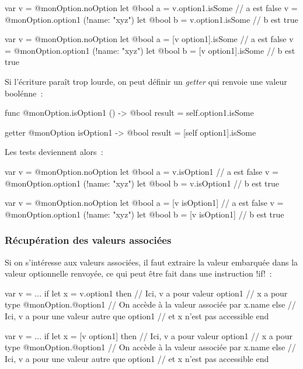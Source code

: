 \begin{galgas4}
var v = @monOption.noOption
let @bool a = v.option1.isSome // a est false
v = @monOption.option1 (!name: "xyz")
let @bool b = v.option1.isSome // b est true
\end{galgas4}
\begin{galgas3}
var v = @monOption.noOption
let @bool a = [v option1].isSome // a est false
v = @monOption.option1 (!name: "xyz")
let @bool b = [v option1].isSome // b est true
\end{galgas3}

Si l'écriture paraît trop lourde, on peut définir un \emph{getter} qui renvoie une valeur boolénne~:
\begin{galgas4}
func @monOption.isOption1 () -> @bool {
  result = self.option1.isSome
}
\end{galgas4}
\begin{galgas3}
getter @monOption isOption1 -> @bool {
  result = [self option1].isSome
}
\end{galgas3}

Les tests deviennent alors~:
\begin{galgas4}
var v = @monOption.noOption
let @bool a = v.isOption1 // a est false
v = @monOption.option1 (!name: "xyz")
let @bool b = v.isOption1 // b est true
\end{galgas4}
\begin{galgas3}
var v = @monOption.noOption
let @bool a = [v isOption1] // a est false
v = @monOption.option1 (!name: "xyz")
let @bool b = [v isOption1] // b est true
\end{galgas3}




\subsubsection{Récupération des valeurs associées}

Si on s'intéresse aux valeurs associées, il faut extraire la valeur embarquée dans la valeur optionnelle renvoyée, ce qui peut être fait dans une instruction \ggsq!if!~:

\begin{galgas4}
var v = ...
if let x = v.option1 then
  // Ici, v a pour valeur option1
  // x a pour type @monOption.@option1
  // On accède à la valeur associée par x.name
else
  // Ici, v a pour une valeur autre que option1
  // et x n'est pas accessible
end
\end{galgas4}

\begin{galgas3}
var v = ...
if let x = [v option1] then
  // Ici, v a pour valeur option1
  // x a pour type @monOption.@option1
  // On accède à la valeur associée par x.name
else
  // Ici, v a pour une valeur autre que option1
  // et x n'est pas accessible
end
\end{galgas3}



















